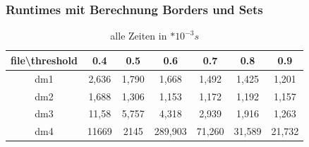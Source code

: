 \documentclass{beamer}
\begin{document}
\begin{frame} %
	\frametitle{Runtimes mit Berechnung Borders und Sets} %
	\begin{table}    
		\centering    
		\begin{tabular}{|c|c|c|c|c|c|c|}    
			\hline file\textbackslash threshold& 0.4& 0.5& 0.6& 0.7& 0.8& 0.9 \\
			\hline dm1& 2,636& 1,790& 1,668& 1,492& 1,425& 1,201\\
			\hline dm2& 1,688& 1,306& 1,153& 1,172& 1,192& 1,157\\
			\hline dm3& 11,58& 5,757& 4,318& 2,939& 1,916& 1,263\\
			\hline dm4& 11669 & 2145& 289,903& 71,260& 31,589& 21,732\\
			\hline 
		\end{tabular}    
		\caption{alle Zeiten in $*10^{-3}s$}    
	\end{table}    
\end{frame}
\end{document}
